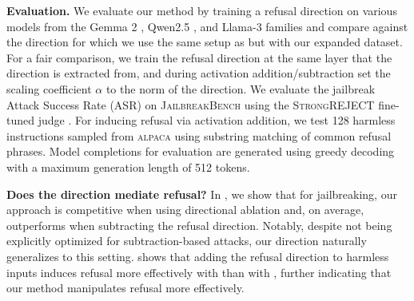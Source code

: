 \textbf{Evaluation.} We evaluate our method by training a refusal direction on various models from the Gemma 2 \cite{team2024gemma}, Qwen2.5 \cite{yang2024qwen2}, and Llama-3 \cite{dubey2024llama} families and compare against the \dimacro direction for which we use the same setup as \citet{arditi2024refusallanguagemodelsmediated} but with our expanded dataset. For a fair comparison, we train the refusal direction at the same layer that the \dimacro direction is extracted from, and during activation addition/subtraction set the scaling coefficient $\alpha$ to the norm of the \dimacro direction. We evaluate the jailbreak Attack Success Rate (ASR) on \textsc{JailbreakBench} \cite{chao2024jailbreakbench} using the \textsc{StrongREJECT} fine-tuned judge \cite{souly2024strongreject}. For inducing refusal via activation addition, we test 128 harmless instructions sampled from \textsc{alpaca} using substring matching of common refusal phrases. Model completions for evaluation are generated using greedy decoding with a maximum generation length of 512 tokens.



\textbf{Does the direction mediate refusal?}
In , we show that for jailbreaking, our approach is competitive when using directional ablation and, on average, outperforms \dimacro when subtracting the refusal direction. Notably, despite not being explicitly optimized for subtraction-based attacks, our direction naturally generalizes to this setting.  shows that adding the refusal direction to harmless inputs induces refusal more effectively with \oursacro than with \dimacro, further indicating that our method manipulates refusal more effectively.

